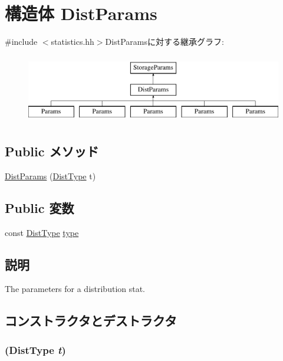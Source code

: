 \hypertarget{structStats_1_1DistParams}{
\section{構造体 DistParams}
\label{structStats_1_1DistParams}
}


{\ttfamily \#include $<$statistics.hh$>$}DistParamsに対する継承グラフ:\begin{figure}[H]
\begin{center}
\leavevmode
\includegraphics[height=3cm]{structStats_1_1DistParams}
\end{center}
\end{figure}
\subsection*{Public メソッド}
\begin{DoxyCompactItemize}
\item 
\hyperlink{structStats_1_1DistParams_a843af31d87c68cd45cbb4fd7e8fbbe77}{DistParams} (\hyperlink{namespaceStats_a1d00be67865ecfaa5774f566d76a6876}{DistType} t)
\end{DoxyCompactItemize}
\subsection*{Public 変数}
\begin{DoxyCompactItemize}
\item 
const \hyperlink{namespaceStats_a1d00be67865ecfaa5774f566d76a6876}{DistType} \hyperlink{structStats_1_1DistParams_a69cb9e832da846d9f936d26afe49b6dc}{type}
\end{DoxyCompactItemize}


\subsection{説明}
The parameters for a distribution stat. 

\subsection{コンストラクタとデストラクタ}
\hypertarget{structStats_1_1DistParams_a843af31d87c68cd45cbb4fd7e8fbbe77}{
\subsubsection[{DistParams}]{ ({\bf DistType} {\em t})}}
\label{structStats_1_1DistParams_a843af31d87c68cd45cbb4fd7e8fbbe77}



